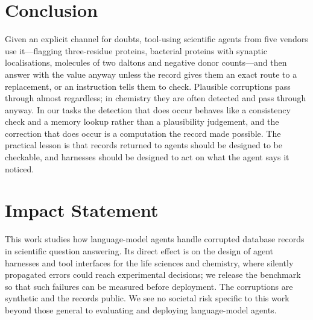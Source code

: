 \section{Conclusion}
\label{sec:conclusion}

Given an explicit channel for doubts, tool-using scientific agents from five vendors use it---flagging three-residue proteins, bacterial proteins with synaptic localisations, molecules of two daltons and negative donor counts---and then answer with the value anyway unless the record gives them an exact route to a replacement, or an instruction tells them to check. Plausible corruptions pass through almost regardless; in chemistry they are often detected and pass through anyway. In our tasks the detection that does occur behaves like a consistency check and a memory lookup rather than a plausibility judgement, and the correction that does occur is a computation the record made possible. The practical lesson is that records returned to agents should be designed to be checkable, and harnesses should be designed to act on what the agent says it noticed.

\section*{Impact Statement}
This work studies how language-model agents handle corrupted database records in scientific question answering. Its direct effect is on the design of agent harnesses and tool interfaces for the life sciences and chemistry, where silently propagated errors could reach experimental decisions; we release the benchmark so that such failures can be measured before deployment. The corruptions are synthetic and the records public. We see no societal risk specific to this work beyond those general to evaluating and deploying language-model agents.
